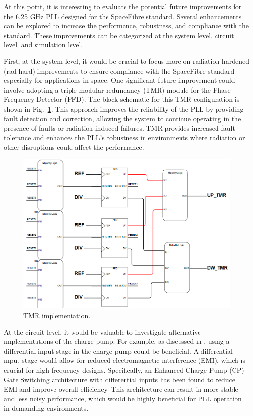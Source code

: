 \documentclass[lettersize,journal]{IEEEtran}
\begin{document}
At this point, it is interesting to evaluate the potential future improvements for the 6.25 GHz PLL designed for the SpaceFibre standard. Several enhancements can be explored to increase the performance, robustness, and compliance with the standard. These improvements can be categorized at the system level, circuit level, and simulation level.

First, at the system level, it would be crucial to focus more on radiation-hardened (rad-hard) improvements to ensure compliance with the SpaceFibre standard, especially for applications in space. One significant future improvement could involve adopting a triple-modular redundancy (TMR) module for the Phase Frequency Detector (PFD). The block schematic for this TMR configuration is shown in Fig.~\ref{fig:tmr}. This approach improves the reliability of the PLL by providing fault detection and correction, allowing the system to continue operating in the presence of faults or radiation-induced failures. TMR provides increased fault tolerance and enhances the PLL’s robustness in environments where radiation or other disruptions could affect the performance.

\begin{figure}
    \centering
    \includegraphics[width=1\linewidth]{images/future_improvements/tmr.png}
    \caption{TMR implementation.}
    \label{fig:tmr}
\end{figure}

At the circuit level, it would be valuable to investigate alternative implementations of the charge pump. For example, as discussed in \cite{original}, using a differential input stage in the charge pump could be beneficial. A differential input stage would allow for reduced electromagnetic interference (EMI), which is crucial for high-frequency designs. Specifically, an Enhanced Charge Pump (CP) Gate Switching architecture with differential inputs has been found to reduce EMI and improve overall efficiency. This architecture can result in more stable and less noisy performance, which would be highly beneficial for PLL operation in demanding environments.
\end{document}
